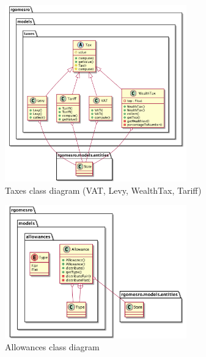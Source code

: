     \begin{figure}[H]
        \centering
        \includegraphics[width=0.7\textwidth]{img/taxesCD.png}
        \caption{Taxes class diagram (VAT, Levy, WealthTax, Tariff)}
        \label{fig:class_diagram_taxes}
    \end{figure}


    \begin{figure}[H]
        \centering
        \includegraphics[width=0.7\textwidth]{img/allowancesCD.png}
        \caption{Allowances class diagram}
        \label{fig:class_diagram_allowances}
    \end{figure}
